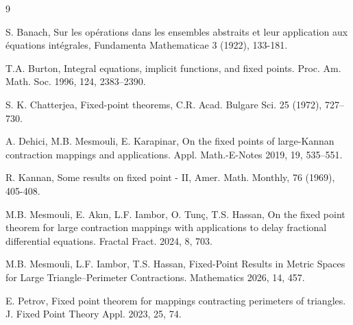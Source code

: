 \documentclass[12 pt]{article}
\theoremstyle{lema}
\theoremstyle{proposition}
\theoremstyle{theorem}
\theoremstyle{theorem}
\theoremstyle{corollary}
\theoremstyle{definition}
\theoremstyle{example}
\begin{document}
	
	\begin{thebibliography}{9}
		
	S. Banach, Sur les opérations dans les ensembles abstraits et leur application aux équations intégrales, Fundamenta Mathematicae 3 (1922), 133-181.
	
	T.A. Burton,  Integral equations, implicit functions, and fixed points. Proc. Am. Math. Soc. 1996, 124, 2383–2390.
	
	S. K. Chatterjea, Fixed-point theorems, C.R. Acad. Bulgare Sci. 25 (1972), 727–730.
	
	A. Dehici, M.B. Mesmouli, E. Karapinar, On the fixed points of large-Kannan contraction mappings and applications. Appl. Math.-E-Notes 2019, 19, 535–551.
	
	R. Kannan, Some results on fixed point - II, Amer. Math. Monthly, 76 (1969), 405-408.
	
	M.B. Mesmouli, E. Akın, L.F. Iambor, O. Tunç, T.S. Hassan,  On the fixed point theorem for large contraction mappings with applications to delay fractional differential equations. Fractal Fract. 2024, 8, 703.
	
	 M.B. Mesmouli, L.F. Iambor, T.S. Hassan, Fixed-Point Results in Metric Spaces for Large Triangle–Perimeter Contractions. Mathematics 2026, 14, 457.
	
	E. Petrov, Fixed point theorem for mappings contracting perimeters of triangles. J. Fixed Point Theory Appl. 2023, 25, 74.

		
		
	\end{thebibliography}
	\medskip
	\vspace{1.2ex}
	
\end{document}
